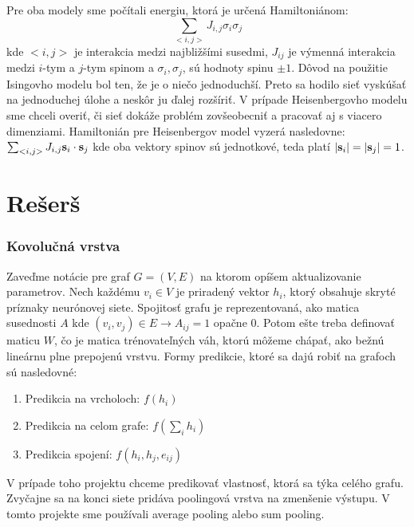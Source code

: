 \documentclass{article}
\begin{document}
Pre oba modely sme počítali energiu, ktorá je určená Hamiltoniánom: 
$$\sum_{<i,j>} J_{i,j}\sigma_i \sigma_j$$
kde $<i,j>$ je interakcia medzi najbližšími susedmi, $J_{ij}$ je výmenná interakcia medzi $i$-tym a $j$-tym spinom a $\sigma_i, \sigma_j$, sú hodnoty spinu $\pm 1$. Dôvod na použitie Isingovho modelu bol ten, že je o niečo jednoduchší. Preto sa hodilo sieť vyskúšať na jednoduchej úlohe a neskôr ju ďalej rozšíriť. V prípade Heisenbergovho modelu sme chceli overiť, či sieť dokáže problém zovšeobecniť a pracovať aj s viacero dimenziami. Hamiltonián pre Heisenbergov model vyzerá nasledovne: $\sum_{<i,j>} J_{i,j} {\bf s}_i \cdot {\bf s}_j$ kde oba vektory spinov sú jednotkové, teda platí $|{\bf s}_i| = |{\bf s}_j| = 1$.

\section*{Rešerš}
\subsubsection*{Kovolučná vrstva} 
Zaveďme notácie pre graf $G=(V,E)$ na ktorom opíšem aktualizovanie parametrov. Nech každému $v_i \in V$ je priradený vektor $h_i$, ktorý obsahuje skryté príznaky neurónovej siete. Spojitosť grafu je reprezentovaná, ako matica susednosti $A$ kde $(v_i, v_j) \in E \rightarrow A_{ij} = 1$ opačne 0. Potom ešte treba definovať maticu $W$, čo je matica trénovateľných váh, ktorú môžeme chápať, ako bežnú lineárnu plne prepojenú vrstvu. Formy predikcie, ktoré sa dajú robiť na grafoch sú nasledovné:
\begin{enumerate}
    \item Predikcia na vrcholoch: $f(h_i)$
    \item Predikcia na celom grafe: $f(\sum_i h_i)$
    \item Predikcia spojení: $f(h_i, h_j, e_{ij})$
\end{enumerate}

V prípade toho projektu chceme predikovať vlastnosť, ktorá sa týka celého grafu. Zvyčajne sa na konci siete pridáva poolingová vrstva na zmenšenie výstupu. V tomto projekte sme používali average pooling alebo sum pooling.
\end{document}
